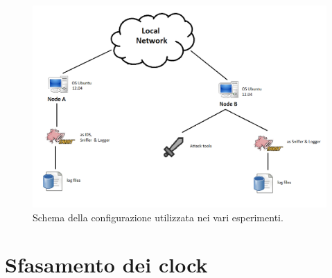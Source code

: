 \begin{figure}[h!]
	\centering
	\includegraphics[scale=0.5]{figure/schema.png}
	\caption{Schema della configurazione utilizzata nei vari esperimenti.}
\end{figure}

\section{Sfasamento dei clock}

